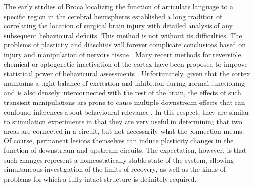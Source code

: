 The early studies of Broca localizing the function of articulate language to a specific region in the cerebral hemispheres \cite{Broca1861} established a long tradition of correlating the location of surgical brain injury with detailed analysis of any subsequent behavioural deficits. This method is not without its difficulties. The problems of plasticity and diaschisis will forever complicate conclusions based on injury and manipulation of nervous tissue \cite{Lashley1933}. Many recent methods for reversible chemical or optogenetic inactivation of the cortex have been proposed to improve statistical power of behavioural assessments \cite{DeFeudis1980,Dong2010,Guo2015}. Unfortunately, given that the cortex maintains a tight balance of excitation and inhibition during normal functioning and is also densely interconnected with the rest of the brain, the effects of such transient manipulations are prone to cause multiple downstream effects that can confound inferences about behavioural relevance \cite{Otchy2015}. In this respect, they are similar to stimulation experiments in that they are very useful in determining that two areas are connected in a circuit, but not necessarily what the connection means. Of course, permanent lesions themselves can induce plasticity changes in the function of downstream and upstream circuits. The expectation, however, is that such changes represent a homeostatically stable state of the system, allowing simultaneous investigation of the limits of recovery, as well as the kinds of problems for which a fully intact structure is definitely required.
